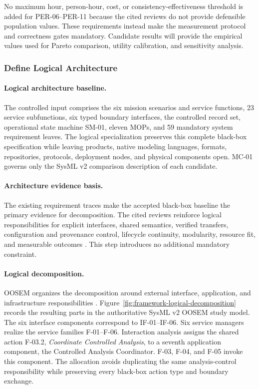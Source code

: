 \documentclass[11pt,a4paper]{article}
\begin{document}
No maximum hour, person-hour, cost, or consistency-effectiveness threshold is added for PER-06--PER-11 because the cited reviews do not provide defensible population values. These requirements instead make the measurement protocol and correctness gates mandatory. Candidate results will provide the empirical values used for Pareto comparison, utility calibration, and sensitivity analysis.

\subsubsection{Define Logical Architecture}

\paragraph{Logical architecture baseline.}
The controlled input comprises the six mission scenarios and service functions, 23 service subfunctions, six typed boundary interfaces, the controlled record set, operational state machine SM-01, eleven MOPs, and 59 mandatory system requirement leaves. The logical specialization preserves this complete black-box specification while leaving products, native modeling languages, formats, repositories, protocols, deployment nodes, and physical components open. MC-01 governs only the SysML v2 comparison description of each candidate.

\paragraph{Architecture evidence basis.}
The existing requirement traces make the accepted black-box baseline the primary evidence for decomposition. The cited reviews reinforce logical responsibilities for explicit interfaces, shared semantics, verified transfers, configuration and provenance control, lifecycle continuity, modularity, resource fit, and measurable outcomes \citep[Secs.~4.4 and 5.1 and Table~5]{buruso2026modelbased} \citep[Secs.~8.4--8.6 and Table~13]{rostamnia2026digitaltwin} \citep[Sec.~4.2.3]{rojasramirez2022comparative} \citep[Sec.~4.7 and Table~3]{vizitiu2025optimizing}. This step introduces no additional mandatory constraint.

\paragraph{Logical decomposition.}
OOSEM organizes the decomposition around external interface, application, and infrastructure responsibilities \citep[Sec.~17.3.4]{friedenthal2014practical}. Figure~\ref{fig:framework-logical-decomposition} records the resulting parts in the authoritative SysML v2 OOSEM study model. The six interface components correspond to IF-01--IF-06. Six service managers realize the service families F-01--F-06. Interaction analysis assigns the shared action F-03.2, \emph{Coordinate Controlled Analysis}, to a seventh application component, the Controlled Analysis Coordinator. F-03, F-04, and F-05 invoke this component. The allocation avoids duplicating the same analysis-control responsibility while preserving every black-box action type and boundary exchange.
\end{document}
